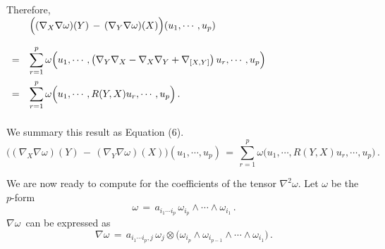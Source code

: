 \documentclass{article}[12pt,a4paper]
\begin{document}
Therefore, \\[0.1in]
$ \begin{array}{rl}
&\displaystyle \Big((\nabla_X \nabla \omega)(Y) \,-\, (\nabla_Y \nabla \omega)(X)\Big)(u_1, \cdots, u_p) \\[0.2in]
=& \displaystyle \sum_{r=1}^p \omega\Big(u_1, \cdots, \big(\nabla_Y \nabla_X - \nabla_X \nabla_Y + \nabla_{[X, Y]}\big)\,u_r, \cdots, u_p\Big) \\[0.2in]
=& \displaystyle \sum_{r=1}^p \omega\Big(u_1, \cdots, R(Y,X)u_r, \cdots, u_p\Big)\,. \\[0.2in]
\end{array}$ \\
\newpage

We summary this result as Equation (6).
\begin{equation}
\Big((\nabla_X \nabla \omega)(Y) \,-\, (\nabla_Y \nabla \omega)(X)\Big)(u_1, \cdots, u_p) \,=\,
\sum_{r=1}^p \omega\Big(u_1, \cdots, R(Y,X)u_r, \cdots, u_p\Big)\,.
\end{equation}

We are now ready to compute for the coefficients of the tensor $\nabla^2 \omega$. Let $\omega$ be the $p$-form
$$ \omega \,=\, a_{i_1\cdots i_p}\, \omega_{i_p}\wedge \cdots\wedge\omega_{i_1}\,. $$
$\nabla \omega$\, can be expressed as 
$$ \nabla \omega \,=\, a_{i_1\cdots i_p,j}\,\omega_j \otimes 
	\big(\omega_{i_p}\wedge \omega_{i_{p-1}} \wedge \cdots \wedge \omega_{i_1}\big)\,. $$
\end{document}
